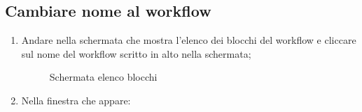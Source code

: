 \subsection{Cambiare nome al workflow}
\begin{enumerate}
	\item Andare nella schermata che mostra l'elenco dei blocchi del workflow e cliccare sul nome del workflow scritto in alto nella schermata;
	\begin{figure}[!ht]
		\centering
		\caption{Schermata elenco blocchi}
	\end{figure}
	\newpage
	\item Nella finestra che appare:

\end{enumerate}
